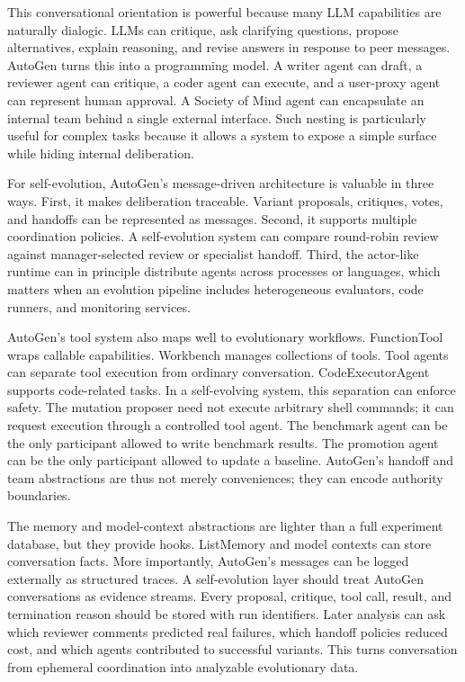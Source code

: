 This conversational orientation is powerful because many LLM capabilities are naturally dialogic.  LLMs can critique, ask clarifying questions, propose alternatives, explain reasoning, and revise answers in response to peer messages.  AutoGen turns this into a programming model.  A writer agent can draft, a reviewer agent can critique, a coder agent can execute, and a user-proxy agent can represent human approval.  A Society of Mind agent can encapsulate an internal team behind a single external interface.  Such nesting is particularly useful for complex tasks because it allows a system to expose a simple surface while hiding internal deliberation.

For self-evolution, AutoGen's message-driven architecture is valuable in three ways.  First, it makes deliberation traceable.  Variant proposals, critiques, votes, and handoffs can be represented as messages.  Second, it supports multiple coordination policies.  A self-evolution system can compare round-robin review against manager-selected review or specialist handoff.  Third, the actor-like runtime can in principle distribute agents across processes or languages, which matters when an evolution pipeline includes heterogeneous evaluators, code runners, and monitoring services.

AutoGen's tool system also maps well to evolutionary workflows.  FunctionTool wraps callable capabilities.  Workbench manages collections of tools.  Tool agents can separate tool execution from ordinary conversation.  CodeExecutorAgent supports code-related tasks.  In a self-evolving system, this separation can enforce safety.  The mutation proposer need not execute arbitrary shell commands; it can request execution through a controlled tool agent.  The benchmark agent can be the only participant allowed to write benchmark results.  The promotion agent can be the only participant allowed to update a baseline.  AutoGen's handoff and team abstractions are thus not merely conveniences; they can encode authority boundaries.

The memory and model-context abstractions are lighter than a full experiment database, but they provide hooks.  ListMemory and model contexts can store conversation facts.  More importantly, AutoGen's messages can be logged externally as structured traces.  A self-evolution layer should treat AutoGen conversations as evidence streams.  Every proposal, critique, tool call, result, and termination reason should be stored with run identifiers.  Later analysis can ask which reviewer comments predicted real failures, which handoff policies reduced cost, and which agents contributed to successful variants.  This turns conversation from ephemeral coordination into analyzable evolutionary data.

